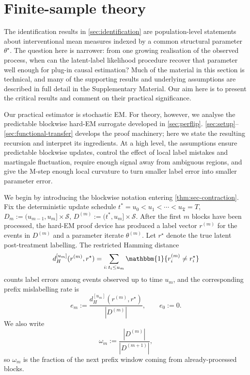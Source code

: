 \documentclass{statsoc}
\newcommand{\1}{\mathbbm{1}}
\newcommand{\Tmax}{\mathfrak{T}}
\begin{document}
\section{Finite-sample theory}\label{sec:finite-sample-theory}

The identification results in \cref{sec:identification} are population-level statements about interventional mean measures indexed by a common structural parameter \(\theta^\star\). The question here is narrower: from one growing realisation of the observed process, when can the latent-label likelihood procedure recover that parameter well enough for plug-in causal estimation? Much of the material in this section is technical, and many of the supporting results and underlying assumptions are described in full detail in the Supplementary Material. Our aim here is to present the critical results and comment on their practical significance.

Our practical estimator is stochastic EM. For theory, however, we analyse the predictable blockwise hard-EM surrogate developed in \cref{sec:perflip}. \cref{sec:setup}--\cref{sec:functional-transfer} develops the proof machinery; here we state the resulting recursion and interpret its ingredients. At a high level, the assumptions ensure predictable blockwise updates, control the effect of local label mistakes and martingale fluctuation, require enough signal away from ambiguous regions, and give the M-step enough local curvature to turn smaller label error into smaller parameter error.

We begin by introducing the blockwise notation entering \cref{thm:sec-contraction}.  Fix the deterministic update schedule
\(
t^\ast=u_0<u_1<\cdots<u_{\Tmax}=T\),
\(
D_m:=(u_{m-1},u_m]\times\mathcal S\),
\(
D^{(m)}:=(t^\ast,u_m]\times\mathcal S.
\)
After the first \(m\) blocks have been processed, the hard-EM proof device has produced a label vector \(r^{(m)}\) for the events in \(D^{(m)}\) and a parameter iterate \(\theta^{(m)}\). Let \(r^\star\) denote the true latent post-treatment labelling. The restricted Hamming distance
\[
d_H^{[u_m]}(r^{(m)},r^\star)
=
\sum_{i:\,t_i\le u_m}\1\{r_i^{(m)}\neq r_i^\star\}
\]
counts label errors among events observed up to time \(u_m\), and the corresponding prefix mislabelling rate is
\[
e_m:=\frac{d_H^{[u_m]}(r^{(m)},r^\star)}{|D^{(m)}|},
\qquad e_0:=0.
\]
We also write
\[
\omega_m:=\frac{|D^{(m)}|}{|D^{(m+1)}|},
\]
so \(\omega_m\) is the fraction of the next prefix window coming from already-processed blocks.
\end{document}
